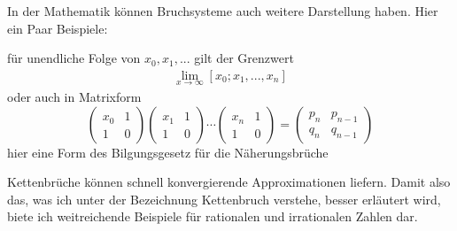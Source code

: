 In der Mathematik können Bruchsysteme auch weitere Darstellung haben. 
Hier ein Paar Beispiele:

für unendliche Folge von $x_0,x_1,...$ gilt der Grenzwert
\begin{align*}
\lim_{x\to\infty} [x_0;x_1,...,x_n] 
\end{align*}  
oder auch in Matrixform
\begin{equation*}
	\begin{pmatrix}
		x_0&	1\\
		1  &	0
	\end{pmatrix}
	\begin{pmatrix}
		x_1&	1\\
		1  &	0
	\end{pmatrix}
	\cdots
	\begin{pmatrix}
		x_n&	1\\
		1  &	0
	\end{pmatrix}
	=\begin{pmatrix}
		p_n&	p_{n-1}\\
		q_n&	q_{n-1}
	\end{pmatrix} 
\end{equation*}
hier eine Form des Bilgungsgesetz für die Näherungsbrüche

Kettenbrüche können schnell konvergierende Approximationen liefern.
Damit also das, was ich unter der Bezeichnung Kettenbruch verstehe,
besser erläutert wird, biete ich weitreichende Beispiele für
rationalen und irrationalen Zahlen dar.
